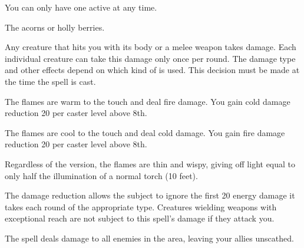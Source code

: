 \begin{spellnotes}
  You can only have one  active at any time.
\end{spellnotes}
\par {} The acorns or holly berries.

\spellrng{\rngpers}
\begin{spelleffect}
  Any creature that hits you with its body or a melee weapon takes damage. Each individual creature can take this damage only once per round. The damage type and other effects depend on which kind of  is used. This decision must be made at the time the spell is cast.

  \par {} The flames are warm to the touch and deal fire damage. You gain cold damage reduction 20  per caster level above 8th.
  \par {} The flames are cool to the touch and deal cold damage. You gain fire damage reduction 20  per caster level above 8th.

  Regardless of the version, the flames are thin and wispy, giving off light equal to only half the illumination of a normal torch (10 feet).
\end{spelleffect}
\begin{spellnotes}
  The damage reduction allows the subject to ignore the first 20 energy damage it takes each round of the appropriate type. Creatures wielding weapons with exceptional reach are not subject to this spell's damage if they attack you.
\end{spellnotes}

\spellrng{\rngmed}
\begin{spelleffect}
  The spell deals damage to all enemies in the area, leaving your allies unscathed.
\end{spelleffect}

